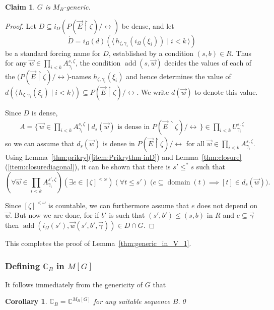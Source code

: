 \documentclass[
twoside,
]{article}
\newtheorem{corollary}[theorem]{Corollary}
\newtheorem{claim}{Claim}[theorem]
\theoremstyle{definition}
\theoremstyle{remark}
\DeclareMathOperator{\add}{add}
\newcommand{\ords}{\Omega}
\newcommand\gkeq{\leftrightarrow}
\newcommand\mgkeq{/{\gkeq}}
\newcommand{\set}[1]{\{\,#1\,\}}
\newcommand{\pair}[1]{\langle#1\rangle}
\newcommand{\seq}[1]{\pair{\,#1\,}}
\newcommand{\restrict}{{\upharpoonright}}
\DeclareMathOperator{\domain}{domain}
\newcommand\chang{\mathbb{C}}
\begin{document}
  
  \begin{claim}\label{thm:Ggeneric-claim}
    $G$ is $M_B$-generic.
  \end{claim}
  \begin{proof}
    Let $D\subseteq i_{\ords}(P(\vec E\restrict\zeta)\mgkeq)$ be
    dense, and let \[\dot D=i_{\ords}(d) (\seq{h_{\zeta,\gamma_i}(i_{\ords}(\xi_i))\mid i<k})\] be
    a standard forcing name for $D$, established by a condition
    $(s,b)\in R$.    Thus for any $\vec
    w\in\prod_{i<k}A^{s,\zeta}_{\gamma_i}$,  the condition
    $\add(s,\vec w)$ decides the values  of each of the $(P(\vec
    E\restrict\zeta)\mgkeq$)-names
    $h_{\zeta,\gamma_i}(\xi_i)$ and hence determines the value of
    $d(\seq{h_{\zeta,\gamma_i}(\xi_i)\mid i<k})\subseteq P(\vec
    E\restrict\zeta)\mgkeq$. 
    We write $d(\vec
    w)$ to denote this value.     

    Since $D$ is dense, 
    \begin{align*}
      A=\set{\vec w\in\prod_{i<k}A^{s,\zeta}_{\gamma_i}\mid d_{s}(\vec w)
      \text{ is dense in }P(\vec E\restrict\zeta)\mgkeq}\in\prod_{i<k}U^{s,\zeta}_{\gamma_i}
    \end{align*}
    so we can assume that $d_{s}(\vec w)$ is dense in $P(\vec
    E\restrict\zeta)\mgkeq$ for all $\vec w\in\prod_{i<k}A^{s,\zeta}_{\gamma_i}$.
    Using Lemma~\ref{thm:prikry}(\ref{item:Prikrythm-inD})
    and Lemma~\ref{thm:closure}(\ref{item:closurediagonal}), it can be
    shown that there is $s'\leq^*s$ such that 
    \begin{equation*}
(\forall \vec 
    w\in\prod_{i<k}A^{s',\zeta}_{\gamma_i})(\exists e\in[\zeta]^{<\omega})(\forall t\leq
    s')\;\bigl(e\subseteq\domain(t)\implies [t]\in d_{s}(\vec w)\bigr). 
  \end{equation*}

  Since $[\zeta]^{<\omega}$ is countable, 
  we can furthermore assume that $e$ does not depend on $\vec w$.
  But     now we are done, for if $b'$ is such that $(s',b')\leq(s,b)$ 
  in $R$ and $e\subseteq\vec\gamma $ then 
  $\add(i_{\ords}(s'), \vec w(s',b',\vec\gamma))\in D\cap G$.
\end{proof}

This completes the proof of Lemma~\ref{thm:generic_in_V_1}.
\subsubsection{Defining $\chang_{B}$ in  $M[G]$}
  

It follows immediately from the genericity of $G$ that 
  \begin{corollary}
    \label{thm:suitableCB}
   $\chang_{B}=\chang^{M_B[G]}$  for any suitable sequence $B$.\qed
  \end{corollary}
\end{document}
